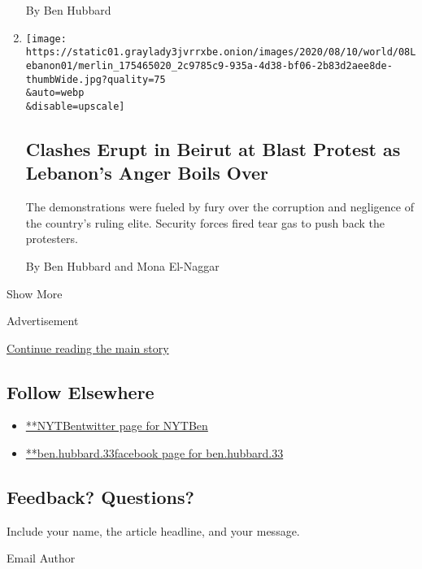 \begin{enumerate}
  By Ben Hubbard
\item
  \href{/2020/08/08/world/middleeast/Beirut-explosion-protests-lebanon.html}{}

  \texttt{[image: https://static01.graylady3jvrrxbe.onion/images/2020/08/10/world/08Lebanon01/merlin\_175465020\_2c9785c9-935a-4d38-bf06-2b83d2aee8de-thumbWide.jpg?quality=75\\\&auto=webp\\\&disable=upscale]}

  \hypertarget{clashes-erupt-in-beirut-at-blast-protest-as-lebanons-anger-boils-over}{%
  \subsection{Clashes Erupt in Beirut at Blast Protest as Lebanon's
  Anger Boils
  Over}\label{clashes-erupt-in-beirut-at-blast-protest-as-lebanons-anger-boils-over}}

  The demonstrations were fueled by fury over the corruption and
  negligence of the country's ruling elite. Security forces fired tear
  gas to push back the protesters.

  By Ben Hubbard and Mona El-Naggar
\end{enumerate}

Show More

Advertisement

\protect\hyperlink{after-mid2}{Continue reading the main story}

\hypertarget{follow-elsewhere}{%
\subsection{Follow Elsewhere}\label{follow-elsewhere}}

\begin{itemize}
\tightlist
\item
  \href{https://twitter.com/NYTBen}{**NYTBentwitter page for NYTBen}
\item
  \href{https://www.facebookcorewwwi.onion/ben.hubbard.33}{**ben.hubbard.33facebook
  page for ben.hubbard.33}
\end{itemize}

\hypertarget{feedback-questions}{%
\subsection{Feedback? Questions?}\label{feedback-questions}}

Include your name, the article headline, and your message.

Email Author

